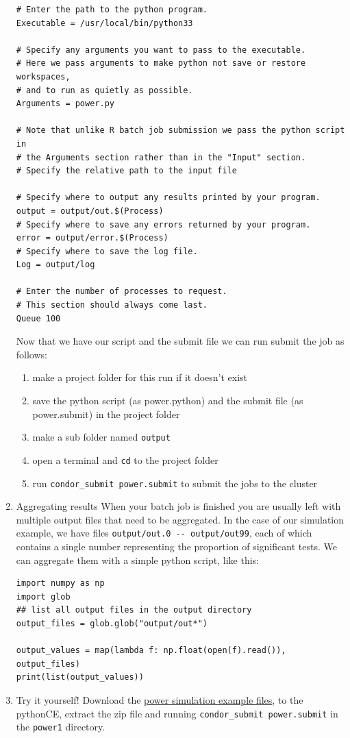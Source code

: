 \documentclass[11pt]{article}
\begin{document}
\begin{enumerate}
\begin{verbatim}
# Enter the path to the python program.
Executable = /usr/local/bin/python33

# Specify any arguments you want to pass to the executable.
# Here we pass arguments to make python not save or restore workspaces,
# and to run as quietly as possible.
Arguments = power.py

# Note that unlike R batch job submission we pass the python script in
# the Arguments section rather than in the "Input" section.
# Specify the relative path to the input file

# Specify where to output any results printed by your program.
output = output/out.$(Process)
# Specify where to save any errors returned by your program.
error = output/error.$(Process)
# Specify where to save the log file.
Log = output/log

# Enter the number of processes to request.
# This section should always come last.
Queue 100
\end{verbatim}

Now that we have our script and the submit file we can run submit the job as follows:
\begin{enumerate}
\item make a project folder for this run if it doesn't exist
\item save the python script (as power.python) and the submit file (as power.submit) in the project folder
\item make a sub folder named \texttt{output}
\item open a terminal and \texttt{cd} to the project folder
\item run \texttt{condor\_submit power.submit} to submit the jobs to the cluster
\end{enumerate}

\item Aggregating results
\label{sec:org9b9ce6c}
When your batch job is finished you are usually left with multiple output files that need to be aggregated. In the case of our simulation example, we have files \texttt{output/out.0 -{}- output/out99}, each of which contains a single number representing the proportion of significant tests. We can aggregate them with a simple python script, like this:
\begin{verbatim}
import numpy as np
import glob
## list all output files in the output directory
output_files = glob.glob("output/out*")

output_values = map(lambda f: np.float(open(f).read()), output_files)
print(list(output_values))
\end{verbatim}

\item Try it yourself!
\label{sec:org25f9c47}
Download the \href{Python\_examples/power1.zip}{power simulation example files}, to the pythonCE, extract the zip file and running \texttt{condor\_submit power.submit} in the \texttt{power1} directory.
\end{enumerate}
\end{document}
